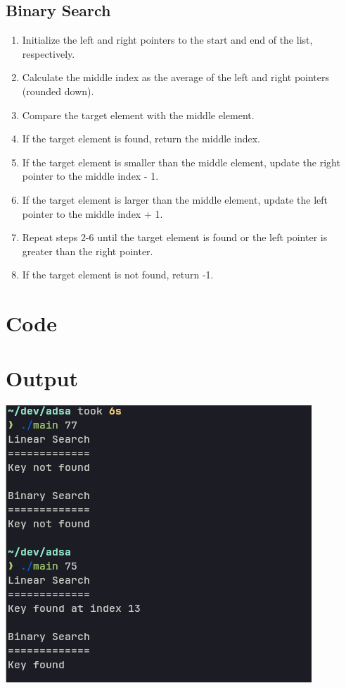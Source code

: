 \documentclass[12pt]{fphw}
\begin{document}
\subsection{Binary Search}
\begin{enumerate}
  \item Initialize the left and right pointers to the start and end of the list, respectively.
  \item Calculate the middle index as the average of the left and right pointers (rounded down).
  \item Compare the target element with the middle element.
  \item If the target element is found, return the middle index.
  \item If the target element is smaller than the middle element, update the right pointer to the middle index - 1.
  \item If the target element is larger than the middle element, update the left pointer to the middle index + 1.
  \item Repeat steps 2-6 until the target element is found or the left pointer is greater than the right pointer.
  \item If the target element is not found, return -1.
\end{enumerate}
\section{Code}
    
\section{Output}
  \begin{center}
    \includegraphics[width=0.5\columnwidth]{./e1.png}
  \end{center}
\end{document}
